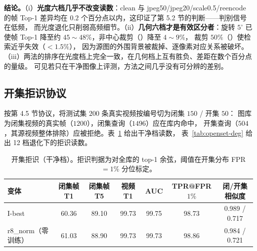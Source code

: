 \textbf{结论。}（i）\textbf{光度六档几乎不改变读数}：clean 与 jpeg50/jpeg20/scale0.5/reencode
的帧 Top-1 差异均在 $0.2$ 个百分点以内，这印证了第 5.2 节的判断——判别信号在低频，
而光度退化只削弱高频细节。（ii）\textbf{几何六档才是有效区分者}：旋转 $5^\circ$ 已使帧 Top-1
降至约 $45\sim48\%$，非中心裁剪（）降至 $4\sim9\%$，
裁剪 $50\%$（）使检索近乎失效（$<1.5\%$），
因为源图的外围背景被裁掉、逐像素对应关系被破坏。
（iii）两法的排序在光度档上完全一致，在几何档上互有胜负、差距在数个百分点的量级。
可见若只在干净图像上评测，方法之间几乎没有可分辨的差别。

\subsection{开集拒识协议}
\label{sec:openset-exp}

按第 4.5 节协议，将测试集 $200$ 条真实视频按编号切为闭集 $150$ / 开集 $50$：
图库为闭集视频的真实帧（$1200$），闭集查询（$1496$）应在库内命中，
开集查询（$504$，其源视频整体排除）应被拒绝。表~\ref{tab:openset-clean} 给出干净档读数，
表~\ref{tab:openset-deg} 给出 12 档退化下的拒识读数。

\begin{table}[t]
\centering
\caption{开集拒识（干净档）。拒识判据为对全库的 top-1 余弦，阈值在开集分布 FPR$=1\%$ 分位标定。}
\label{tab:openset-clean}
\small
\begin{tabular}{lcccccc}
\toprule
变体 & 闭集帧 T1 & 闭集帧 T5 & 视频 T1 & AUC & TPR@FPR$1\%$ & 闭/开集相似度 \\
\midrule
I-best         & 60.36 & 89.10 & 99.73 & 99.75 & 98.73 & 0.989 / 0.717 \\
r8\_norm（零训练）& 61.03 & 88.90 & 99.73 & 99.73 & 98.86 & 0.984 / 0.721 \\
\bottomrule
\end{tabular}
\end{table}

